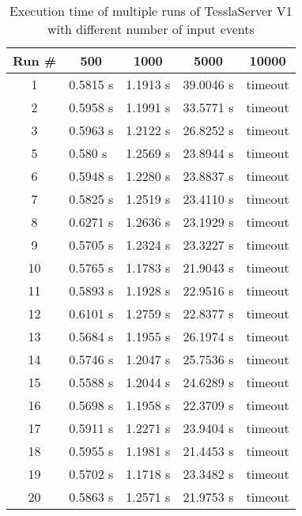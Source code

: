 \begin{table}[!htb]
  \centering
  \caption{Execution time of multiple runs of TesslaServer V1 with different number of input events}
  \label{table:tessla_server_v1_events_num_events_data}
  \begin{tabular}{cllll}
    Run \# & \multicolumn{1}{c}{500} & \multicolumn{1}{c}{1000} & \multicolumn{1}{c}{5000}  & \multicolumn{1}{c}{10000} \\ \hline
    1 &  0.5815 s & 1.1913 s & 39.0046 s & timeout\\
    2 &  0.5958 s & 1.1991 s & 33.5771 s & timeout\\
    3 &  0.5963 s & 1.2122 s & 26.8252 s & timeout\\
    5 &  0.580 s  & 1.2569 s & 23.8944 s & timeout\\
    6 &  0.5948 s & 1.2280 s & 23.8837 s & timeout\\
    7 &  0.5825 s & 1.2519 s & 23.4110 s & timeout\\
    8 &  0.6271 s & 1.2636 s & 23.1929 s & timeout\\
    9 &  0.5705 s & 1.2324 s & 23.3227 s & timeout\\
    10 & 0.5765 s & 1.1783 s & 21.9043 s & timeout\\
    11 & 0.5893 s & 1.1928 s & 22.9516 s & timeout\\
    12 & 0.6101 s & 1.2759 s & 22.8377 s & timeout\\
    13 & 0.5684 s & 1.1955 s & 26.1974 s & timeout\\
    14 & 0.5746 s & 1.2047 s & 25.7536 s & timeout\\
    15 & 0.5588 s & 1.2044 s & 24.6289 s & timeout\\
    16 & 0.5698 s & 1.1958 s & 22.3709 s & timeout\\
    17 & 0.5911 s & 1.2271 s & 23.9404 s & timeout\\
    18 & 0.5955 s & 1.1981 s & 21.4453 s & timeout\\
    19 & 0.5702 s & 1.1718 s & 23.3482 s & timeout\\
    20 & 0.5863 s & 1.2571 s & 21.9753 s & timeout
  \end{tabular}
\end{table}


